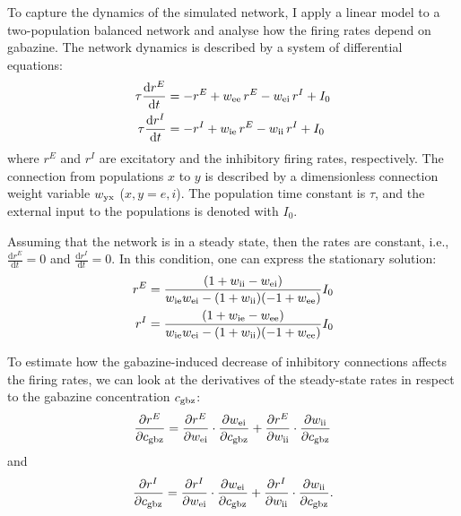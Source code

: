     To capture the dynamics of the simulated network, I apply a linear model to
    a two-population balanced network and analyse how the firing rates depend
    on gabazine. The network dynamics is described by a system of differential
    equations:
    \begin{equation}
      \begin{split}
        \tau \frac{\text{d}r^E}{\text{d}t} &= - r^E + w_{\rm ee} \, r^E -w_{\rm ei} \, r^I + I_0\\
        \tau \frac{\text{d}r^I}{\text{d}t} &= - r^I + w_{\rm ie} \, r^E -w_{\rm ii} \, r^I + I_0\\
      \end{split}
      \label{eq:balanced_net}
    \end{equation}
    where $r^E$ and $r^I$ are excitatory and the inhibitory firing rates,
    respectively. The connection from populations $x$ to $y$ is described by a dimensionless
    connection weight variable $w_{\rm yx}$ ($x,y = e, i$). The population time constant
    is $\tau$, and the external input to the populations is denoted with $I_0$.

    Assuming that the network is in a steady state, then the rates are
    constant, i.e., $ \frac{\text{d}r^E}{\text{d}t} = 0$ and
    $\frac{\text{d}r^I}{\text{d}t} = 0 $. In this condition, one can express
    the stationary solution:
    \begin{equation}
      \begin{split}
        r^E &= \frac{(1+w_{\rm ii} - w_{\rm ei})}{w_{\rm ie}w_{\rm ei} -
                (1+w_{\rm ii})(-1+w_{\rm ee})} I_0 \\
        r^I &= \frac{(1+w_{\rm ie} - w_{\rm ee})}{w_{\rm ie}w_{\rm ei} -
                (1+w_{\rm ii})(-1+w_{\rm ee})} I_0
      \end{split}
      \label{eq:balanced_sol}
    \end{equation}
  
    To estimate how the gabazine-induced decrease of inhibitory connections
    affects the firing rates, we can look at the derivatives of the
    steady-state rates in respect to the gabazine concentration $c_{\rm gbz}$:
    \begin{equation}
      \frac{\partial r^E}{\partial c_{\rm gbz}} =
      \frac{\partial r^E}{\partial w_{\rm ei}} \cdot \frac{\partial w_{\rm ei}}{\partial c_{\rm gbz}} + 
      \frac{\partial r^E}{\partial w_{\rm ii}} \cdot \frac{\partial w_{\rm ii}}{\partial c_{\rm gbz}}
      \label{eq:re_chain}
    \end{equation}
    and
    \begin{equation}
      \frac{\partial r^I}{\partial c_{\rm gbz}} =
      \frac{\partial r^I}{\partial w_{\rm ei}} \cdot \frac{\partial w_{\rm ei}}{\partial c_{\rm gbz}} + 
      \frac{\partial r^I}{\partial w_{\rm ii}} \cdot \frac{\partial w_{\rm ii}}{\partial c_{\rm gbz}}.
      \label{eq:ri_chain}
    \end{equation}

